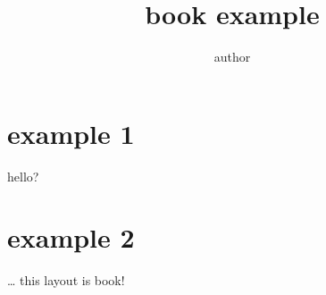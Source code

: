\documentclass[a4paper,11pt]{book}
\author{author}
\title{book example}
\begin{document}
 
\maketitle 
\tableofcontents 
\section{example 1} hello?
\section{example 2} 
\ldots{} this layout is book!
\end{document}
